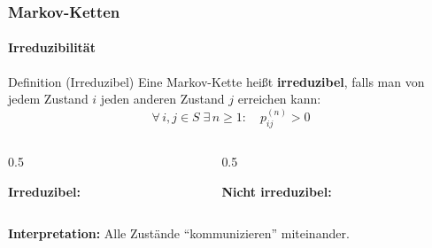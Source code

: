 \documentclass{beamer}
\begin{document}
\begin{frame}
    \frametitle{Markov-Ketten}
\framesubtitle{Irreduzibilität}
    \begin{block}{Definition (Irreduzibel)}
Eine Markov-Kette heißt \textbf{irreduzibel}, falls man von jedem Zustand $i$ jeden anderen Zustand $j$ erreichen kann:
\[
\forall\, i,j \in S \;\exists\, n \geq 1: \quad p_{ij}^{(n)} > 0
\]
\end{block}
\begin{columns}
\begin{column}{0.5\textwidth}
\begin{center}
\textbf{Irreduzibel:}\\[0.3cm]
\end{center}
\end{column}
\begin{column}{0.5\textwidth}
\begin{center}
\textbf{Nicht irreduzibel:}\\[0.3cm]
\end{center}
\end{column}
\end{columns}
\vspace{0.3cm}
\textbf{Interpretation:} Alle Zustände ``kommunizieren'' miteinander.
 \end{frame}


\end{document}
